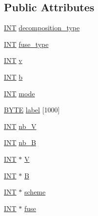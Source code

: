 \subsection*{Public Attributes}
\begin{DoxyCompactItemize}
\item 
\mbox{\hyperlink{galois_8h_a09fddde158a3a20bd2dcadb609de11dc}{I\+NT}} \mbox{\hyperlink{classgeo__parameter_a4096e2ad05821167aea019a6a9f5c1f7}{decomposition\+\_\+type}}
\item 
\mbox{\hyperlink{galois_8h_a09fddde158a3a20bd2dcadb609de11dc}{I\+NT}} \mbox{\hyperlink{classgeo__parameter_a556e20216a84b51c77840208d609fbcc}{fuse\+\_\+type}}
\item 
\mbox{\hyperlink{galois_8h_a09fddde158a3a20bd2dcadb609de11dc}{I\+NT}} \mbox{\hyperlink{classgeo__parameter_a9c47846907cf86b351f4139e57c1127a}{v}}
\item 
\mbox{\hyperlink{galois_8h_a09fddde158a3a20bd2dcadb609de11dc}{I\+NT}} \mbox{\hyperlink{classgeo__parameter_a2d691d90abfde3f3ff1a3587fd236a23}{b}}
\item 
\mbox{\hyperlink{galois_8h_a09fddde158a3a20bd2dcadb609de11dc}{I\+NT}} \mbox{\hyperlink{classgeo__parameter_a80930f0f52cf0c35da8a9ad02052684b}{mode}}
\item 
\mbox{\hyperlink{galois_8h_ab6cc7b4aeb6ea31aba2b3fbfc83ff5e6}{B\+Y\+TE}} \mbox{\hyperlink{classgeo__parameter_a493494adde94a7449804b2a06f12effa}{label}} \mbox{[}1000\mbox{]}
\item 
\mbox{\hyperlink{galois_8h_a09fddde158a3a20bd2dcadb609de11dc}{I\+NT}} \mbox{\hyperlink{classgeo__parameter_a7fed54be3220ca9bd94c8a7ae80ce149}{nb\+\_\+V}}
\item 
\mbox{\hyperlink{galois_8h_a09fddde158a3a20bd2dcadb609de11dc}{I\+NT}} \mbox{\hyperlink{classgeo__parameter_a3ede9739e9d5809072b3acc8325bf0fa}{nb\+\_\+B}}
\item 
\mbox{\hyperlink{galois_8h_a09fddde158a3a20bd2dcadb609de11dc}{I\+NT}} $\ast$ \mbox{\hyperlink{classgeo__parameter_a253afaf1c892d8d280451e9ce53dd838}{V}}
\item 
\mbox{\hyperlink{galois_8h_a09fddde158a3a20bd2dcadb609de11dc}{I\+NT}} $\ast$ \mbox{\hyperlink{classgeo__parameter_aa7a5e8468727929e9d8d490b0974fd2f}{B}}
\item 
\mbox{\hyperlink{galois_8h_a09fddde158a3a20bd2dcadb609de11dc}{I\+NT}} $\ast$ \mbox{\hyperlink{classgeo__parameter_af3459e6afcc79c081bc00cdc783301f8}{scheme}}
\item 
\mbox{\hyperlink{galois_8h_a09fddde158a3a20bd2dcadb609de11dc}{I\+NT}} $\ast$ \mbox{\hyperlink{classgeo__parameter_a12199efeb918421eaaf17ed597014640}{fuse}}

\end{DoxyCompactItemize}
